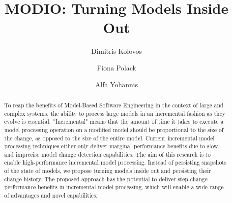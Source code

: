 \documentclass{llncs}
\begin{document}
\renewcommand{\thelstlisting}{\arabic{lstlisting}}
\renewcommand{\labelitemi}{$\bullet$}

\title{MODIO: Turning Models Inside Out}
%
%
\author{Dimitris Kolovos \and Fiona Polack \and Alfa Yohannis}
%
%
%

\maketitle              %

\begin{abstract}
To reap the benefits of Model-Based Software Engineering in the context of large and complex systems, the ability to process large models in an incremental fashion as they evolve is essential. ``Incremental" means that the amount of time it takes to execute a model processing operation on a modified model should be proportional to the size of the change, as opposed to the size of the entire model. Current incremental model processing techniques either only deliver marginal performance benefits due to slow and imprecise model change detection capabilities. The aim of this research is to enable high-performance incremental model processing. Instead of persisting snapshots of the state of models, we propose turning models inside out and persisting their change history. The proposed approach has the potential to deliver step-change performance benefits in incremental model processing, which will enable a wide range of advantages and novel capabilities.
\end{abstract}
\end{document}
